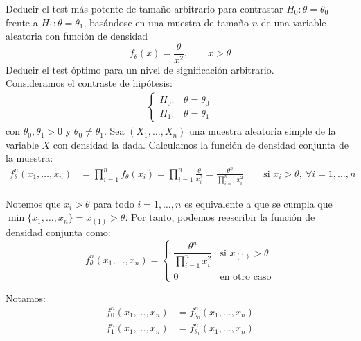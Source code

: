 \begin{ejercicio}
    Deducir el test más potente de tamaño arbitrario para contrastar $H_0 : \theta = \theta_0$ frente a $H_1 : \theta = \theta_1$, basándose en una muestra de tamaño $n$ de una variable aleatoria con función de densidad
    \begin{equation*}
        f_\theta(x) = \frac{\theta}{x^2}, \qquad x>\theta
    \end{equation*}
    Deducir el test óptimo para un nivel de significación arbitrario.\\

    Consideramos el contraste de hipótesis:
    \begin{align*}
        \begin{cases}
            H_0: & \theta = \theta_0 \\
            H_1: & \theta = \theta_1
        \end{cases}
    \end{align*}
    con $\theta_0, \theta_1 > 0$ y $\theta_0 \neq \theta_1$. Sea $(X_1, \ldots, X_n)$ una muestra aleatoria simple de la variable $X$ con densidad la dada. Calculamos la función de densidad conjunta de la muestra:
    \begin{align*}
        f_\theta^n(x_1, \ldots, x_n) &= \prod_{i=1}^{n} f_\theta(x_i) = \prod_{i=1}^{n} \frac{\theta}{x_i^2} = \frac{\theta^n}{\prod\limits_{i=1}^{n} x_i^2} \qquad \text{si\ } x_i > \theta, \ \forall i=1,\ldots,n
    \end{align*}

    Notemos que $x_i > \theta$ para todo $i=1,\ldots,n$ es equivalente a que se cumpla que $\min\{x_1, \ldots, x_n\} = x_{(1)} > \theta$. Por tanto, podemos reescribir la función de densidad conjunta como:
    \begin{equation*}
        f_\theta^n(x_1, \ldots, x_n) = \begin{cases}
            \dfrac{\theta^n}{\prod\limits_{i=1}^{n} x_i^2} & \text{si\ } x_{(1)} > \theta \\[12pt]
            0 & \text{en otro caso}
        \end{cases}
    \end{equation*}

    Notamos:
    \begin{align*}
        f_0^n(x_1, \ldots, x_n) &= f_{\theta_0}^n(x_1, \ldots, x_n) \\
        f_1^n(x_1, \ldots, x_n) &= f_{\theta_1}^n(x_1, \ldots, x_n)
    \end{align*}


\end{ejercicio}
